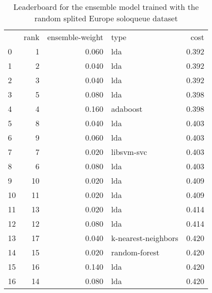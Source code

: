 \begin{table}[]
	\centering
	\begin{tabular}{lrrlr}
		   & rank & ensemble-weight & type                & cost  \\
		0  & 1    & 0.060           & lda                 & 0.392 \\
		1  & 2    & 0.040           & lda                 & 0.392 \\
		2  & 3    & 0.040           & lda                 & 0.392 \\
		3  & 5    & 0.080           & lda                 & 0.398 \\
		4  & 4    & 0.160           & adaboost            & 0.398 \\
		5  & 8    & 0.040           & lda                 & 0.403 \\
		6  & 9    & 0.060           & lda                 & 0.403 \\
		7  & 7    & 0.020           & libsvm-svc          & 0.403 \\
		8  & 6    & 0.080           & lda                 & 0.403 \\
		9  & 10   & 0.020           & lda                 & 0.409 \\
		10 & 11   & 0.020           & lda                 & 0.409 \\
		11 & 13   & 0.020           & lda                 & 0.414 \\
		12 & 12   & 0.080           & lda                 & 0.414 \\
		13 & 17   & 0.040           & k-nearest-neighbors & 0.420 \\
		14 & 15   & 0.020           & random-forest       & 0.420 \\
		15 & 16   & 0.140           & lda                 & 0.420 \\
		16 & 14   & 0.080           & lda                 & 0.420 \\
	\end{tabular}

	\caption{Leaderboard for the ensemble model trained with the random splited Europe soloqueue dataset}
	\label{tab:lb-europe-games-full-randsplit}
\end{table}

